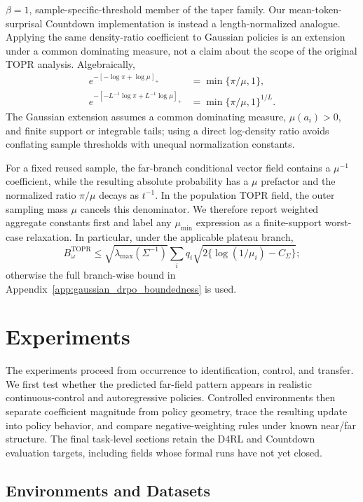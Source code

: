 \(\beta=1\), sample-specific-threshold member of the
taper family. Our mean-token-surprisal Countdown implementation is instead a
length-normalized analogue. Applying the same density-ratio coefficient to
Gaussian policies is an extension under a common dominating measure, not a
claim about the scope of the original TOPR analysis. Algebraically,
\begin{align}
e^{-[-\log\pi+\log\mu]_+}
&=\min\{\pi/\mu,1\},
\label{eq:topr_exact_identity}\\
e^{-[-L^{-1}\log\pi+L^{-1}\log\mu]_+}
&=\min\{\pi/\mu,1\}^{1/L}.
\label{eq:topr_length_normalized}
\end{align}
The Gaussian extension assumes a common dominating measure,
\(\mu(a_i)>0\), and finite support or integrable tails; using a direct
log-density ratio avoids conflating sample thresholds with unequal
normalization constants.

For a fixed reused sample, the far-branch conditional vector field contains
a \(\mu^{-1}\) coefficient, while the resulting absolute probability has a \(\mu\)
prefactor and the normalized ratio \(\pi/\mu\) decays as \(t^{-1}\). In the population
TOPR field, the outer sampling mass \(\mu\) cancels this denominator. We therefore
report weighted aggregate constants first and label any \(\mu_{\min}\) expression as
a finite-support worst-case relaxation. In particular, under the applicable
plateau branch,
\[
B_\omega^{\mathrm{TOPR}}
\le\sqrt{\lambda_{\max}(\Sigma^{-1})}
\sum_iq_i\sqrt{2\{\log(1/\mu_i)-C_\Sigma\}};
\]
otherwise the full branch-wise bound in
Appendix~\ref{app:gaussian_drpo_boundedness} is used.

\section{Experiments}
\label{sec:experiments}

The experiments proceed from occurrence to identification, control, and
transfer. We
first test whether the predicted far-field pattern appears in realistic
continuous-control and autoregressive policies. Controlled environments then
separate coefficient magnitude from policy geometry, trace the resulting
update into policy behavior, and compare negative-weighting rules under known
near/far structure. The final task-level sections retain the D4RL and Countdown
evaluation targets, including fields whose formal runs have not yet closed.

\subsection{Environments and Datasets}
\label{sec:environments_datasets}

